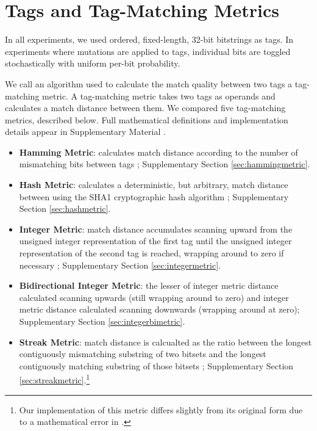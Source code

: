 \section{Tags and Tag-Matching Metrics}

In all experiments, we used ordered, fixed-length, 32-bit bitstrings as tags.
In experiments where mutations are applied to tags, individual bits are toggled stochastically with uniform per-bit probability.

We call an algorithm used to calculate the match quality between two tags a tag-matching metric.
A tag-matching metric takes two tags as operands and calculates a match distance between them.
We compared five tag-matching metrics, described below.
Full mathematical definitions and implementation details appear in Supplementary Material \citep{Moreno_Ofria_2020}.

\begin{itemize}
  \itemsep0em
  \item \textbf{Hamming Metric}: calculates match distance according to the number of mismatching bits between tags \citep{lalejini2019else, hamming1950error}; Supplementary Section \ref{sec:hammingmetric}.
  \item \textbf{Hash Metric}: calculates a deterministic, but arbitrary, match distance between using the SHA1 cryptographic hash algorithm \citep{eastlake2001us}; Supplementary Section \ref{sec:hashmetric}.
  \item \textbf{Integer Metric}: match distance accumulates scanning upward from the unsigned integer representation of the first tag until the unsigned integer representation of the second tag is reached, wrapping around to zero if necessary \citep{spector2011tag}; Supplementary Section \ref{sec:integermetric}.
  \item \textbf{Bidirectional Integer Metric}: the lesser of integer metric distance calculated scanning upwards (still wrapping around to zero) and integer metric distance calculated scanning downwards (wrapping around at zero); Supplementary Section \ref{sec:integerbimetric}.
  \item \textbf{Streak Metric}: match distance is calcualted as the ratio between the longest contiguously mismatching substring of two bitsets and the longest contiguously matching substring of those bitsets \citep{downing2015intelligence}; Supplementary Section \ref{sec:streakmetric}.\footnote{Our implementation of this metric differs slightly from its original form due to a mathematical error in \citep{downing2015intelligence}.}
\end{itemize}

